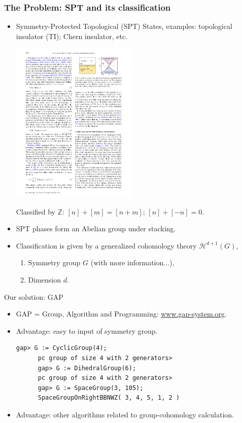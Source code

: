 \documentclass[xcolor=table, aspectratio=169]{beamer}
\begin{document}
\begin{frame}
	\frametitle{The Problem: SPT and its classification}
	\begin{itemize}
		\item Symmetry-Protected Topological (SPT) States, examples: topological insulator (TI); Chern insulator, etc.
		\begin{center}
			\includegraphics[width=6cm]{../spspt/qhe_edge}
		\end{center}
		{\small Classified by $\mathbb Z$: $[n]+[m]=[n+m]$; $[n]+[-n] = 0$.}	  
		\item SPT phases form an Abelian group under stacking.
		\item Classification is given by a generalized cohomology theory $\mathcal H^{d+1}(G)$,
		\begin{enumerate}
			\item Symmetry group $G$ (with more information...),
			\item Dimension $d$.
		\end{enumerate}
	\end{itemize}
\end{frame}

\begin{frame}[fragile]{Our solution: GAP}
  \begin{itemize}
  \item GAP = Group, Algorithm and Programming: \url{www.gap-system.org}.
  \item Advantage: easy to input of symmetry group.
    \begin{lstlisting}[basicstyle=\footnotesize]
      gap> G := CyclicGroup(4);
      pc group of size 4 with 2 generators>
      gap> G := DihedralGroup(6);
      pc group of size 4 with 2 generators>
      gap> G := SpaceGroup(3, 105);
      SpaceGroupOnRightBBNWZ( 3, 4, 5, 1, 2 )
    \end{lstlisting}
  \item Advantage: other algorithms related to group-cohomology calculation.			
  \end{itemize}
\end{frame}
\end{document}
